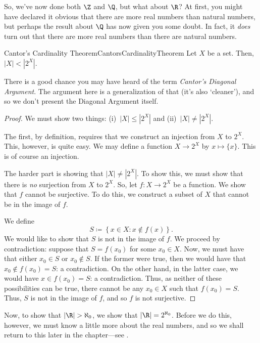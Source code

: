 So, we've now done both $\Z$ and $\Q$, but what about $\R$?  At first, you might have declared it obvious that there are more real numbers than natural numbers, but perhaps the result about $\Q$ has now given you some doubt.  In fact, it \emph{does} turn out that there are more real numbers than there are natural numbers.
\begin{thm}{Cantor's Cardinality Theorem}{CantorsCardinalityTheorem}
Let $X$ be a set.  Then, $|X|<|2^X|$.
\begin{rmk}
There is a good chance you may have heard of the term \emph{Cantor's Diagonal Argument}.  The argument here is a generalization of that (it's also `cleaner'), and so we don't present the Diagonal Argument itself.
\end{rmk}
\begin{proof}
We must show two things:  (i)~$|X|\leq |2^X|$ and (ii)~$|X|\neq |2^X|$.

The first, by definition, requires that we construct an injection from $X$ to $2^X$.  This, however, is quite easy.  We may define a function $X\rightarrow 2^X$ by $x\mapsto \{ x\}$.  This is of course an injection.

The harder part is showing that $|X|\neq |2^X|$.  To show this, we must show that there is \emph{no} surjection from $X$ to $2^X$.  So, let $f\colon X\rightarrow 2^X$ be a function.  We show that $f$ cannot be surjective.  To do this, we construct a subset of $X$ that cannot be in the image of $f$.

We define
\begin{equation}
S\coloneqq \left\{ x\in X:x\notin f(x)\right\} .
\end{equation}
We would like to show that $S$ is not in the image of $f$.  We proceed by contradiction:  suppose that $S=f(x_0)$ for some $x_0\in X$.  Now, we must have that either $x_0\in S$ or $x_0\notin S$.  If the former were true, then we would have that $x_0\notin f(x_0)=S$:  a contradiction.  On the other hand, in the latter case, we would have $x\in f(x_0)=S$:  a contradiction.  Thus, as neither of these possibilities can be true, there cannot be any $x_0\in X$ such that $f(x_0)=S$.  Thus, $S$ is not in the image of $f$, and so $f$ is not surjective.
\end{proof}
\end{thm}
Now, to show that $|\R |>\aleph _0$, we show that $|\R |=2^{\aleph _0}$.  Before we do this, however, we must know a little more about the real numbers, and so we shall return to this later in the chapter---see .

